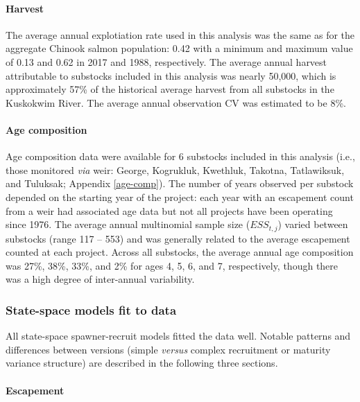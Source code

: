 \documentclass[12pt,]{book}
\let\oldparagraph\paragraph
\renewcommand{\paragraph}[1]{\oldparagraph{#1}\mbox{}}
\theoremstyle{definition}
\theoremstyle{definition}
\theoremstyle{definition}
\theoremstyle{remark}
\begin{document}
\paragraph{Harvest}\label{harv-data-results}

\noindent
The average annual explotiation rate used in this analysis was the same
as for the aggregate Chinook salmon population: 0.42 with a minimum and
maximum value of 0.13 and 0.62 in 2017 and 1988, respectively. The
average annual harvest attributable to substocks included in this
analysis was nearly 50,000, which is approximately 57\% of the
historical average harvest from all substocks in the Kuskokwim River.
The average annual observation CV was estimated to be 8\%.

\paragraph{Age composition}\label{age-data-results}

\noindent
Age composition data were available for 6 substocks included in this
analysis (i.e., those monitored \emph{via} weir: George, Kogrukluk,
Kwethluk, Takotna, Tatlawiksuk, and Tuluksak; Appendix \ref{age-comp}).
The number of years observed per substock depended on the starting year
of the project: each year with an escapement count from a weir had
associated age data but not all projects have been operating since 1976.
The average annual multinomial sample size (\(ESS_{t,j}\)) varied
between substocks (range 117 -- 553) and was generally related to the
average escapement counted at each project. Across all substocks, the
average annual age composition was 27\%, 38\%, 33\%, and 2\% for ages 4,
5, 6, and 7, respectively, though there was a high degree of
inter-annual variability.

\subsubsection{State-space models fit to data}\label{ssm-fit}

\noindent
All state-space spawner-recruit models fitted the data well. Notable
patterns and differences between versions (simple \emph{versus} complex
recruitment or maturity variance structure) are described in the
following three sections.

\paragraph{Escapement}\label{esc-data-fit}
\end{document}
